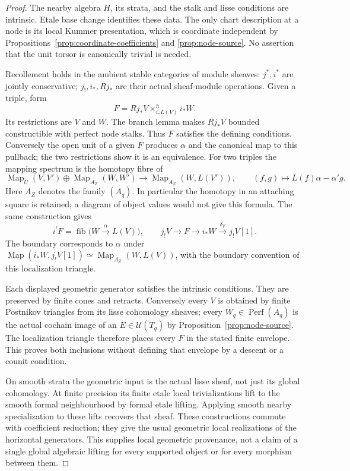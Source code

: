 \documentclass[11pt]{article}
\theoremstyle{definition}
\theoremstyle{remark}
\newcommand{\Perf}{\operatorname{Perf}}
\begin{document}
\begin{proof}
The nearby algebra $H$, its strata, and the stalk and lisse conditions
are intrinsic.  Etale base change identifies these data.  The only
chart description at a node is its local Kummer presentation, which
is coordinate independent by Propositions~\ref{prop:coordinate-coefficients}
and \ref{prop:node-source}.  No assertion that the unit torsor is
canonically trivial is needed.

Recollement holds in the ambient stable categories of module sheaves:
$j^*,i^*$ are jointly conservative; $j_!,i_*,Rj_*$ are their actual
sheaf-module operations.  Given a triple, form
\[
 F=Rj_*V\mathop{\times}^{h}_{i_*L(V)}i_*W.
\]
Its restrictions are $V$ and $W$.  The branch lemma makes $Rj_*V$
bounded constructible with perfect node stalks.  Thus $F$ satisfies
the defining conditions.  Conversely the open unit of a given $F$
produces $\alpha$ and the canonical map to this pullback; the two
restrictions show it is an equivalence.  For two triples the mapping
spectrum is the homotopy fibre of
\[
 \operatorname{Map}_U(V,V')\oplus\operatorname{Map}_{A_Z}(W,W')
 \longrightarrow\operatorname{Map}_{A_Z}(W,L(V')),
 \qquad(f,g)\longmapsto L(f)\alpha-\alpha'g.
\]
Here $A_Z$ denotes the family $(A_q)$.  In particular the homotopy in
an attaching square is retained; a diagram of object values would
not give this formula.  The same construction gives
\[
 i^!F=\operatorname{fib}\bigl(W\xrightarrow{\alpha}L(V)\bigr),
 \qquad j_!V\longrightarrow F\longrightarrow i_*W
           \xrightarrow{\delta_F}j_!V[1].
\]
The boundary corresponds to $\alpha$ under
$\operatorname{Map}(i_*W,j_!V[1])\simeq
\operatorname{Map}_{A_Z}(W,L(V))$, with the boundary convention of
this localization triangle.

Each displayed geometric generator satisfies the intrinsic conditions.
They are preserved by finite cones and retracts.  Conversely every
$V$ is obtained by finite Postnikov triangles from its lisse cohomology
sheaves; every $W_q\in\Perf(A_q)$ is the actual cochain image of an
$E\in\mathcal U(T_q)$ by Proposition~\ref{prop:node-source}.
The localization triangle therefore places every $F$ in the stated
finite envelope.  This proves both inclusions without defining that
envelope by a descent or a counit condition.

On smooth strata the geometric input is the actual lisse sheaf, not
just its global cohomology.  At finite precision its finite etale
local trivializations lift to the smooth formal neighbourhood by
formal etale lifting.  Applying smooth nearby specialization to
these lifts recovers that sheaf.  These constructions commute with
coefficient reduction; they give the usual geometric local
realizations of the horizontal generators.  This supplies local
geometric provenance, not a claim of a single global algebraic
lifting for every supported object or for every morphism between them.


\end{proof}
\end{document}
